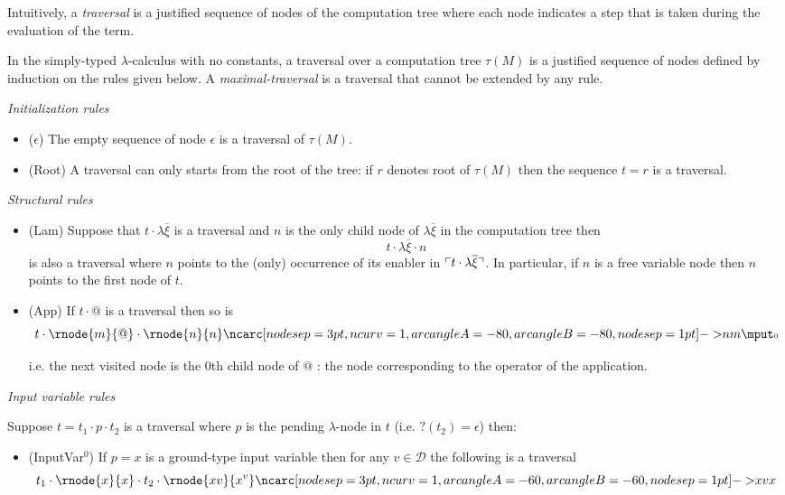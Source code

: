 Intuitively, a \emph{traversal} is a justified sequence of nodes of the computation tree where each node
indicates a step that is taken during the evaluation of the term.

\begin{dfn}
\label{def:traversal}
In the simply-typed $\lambda$-calculus with no constants,
a traversal over a computation tree $\tau(M)$
is a justified sequence of nodes defined by induction on the rules
given below. A \emph{maximal-traversal} is a traversal that cannot be
extended by any rule.

\emph{Initialization rules}
\begin{itemize}
\item ($\epsilon$) The empty sequence of node $\epsilon$ is a traversal of $\tau(M)$.

\item (Root) A traversal can only starts from the root of the tree: if $r$ denotes root of $\tau(M)$ then the sequence $t = r$
is a traversal.
\end{itemize}


\emph{Structural rules}
\begin{itemize}
\item (Lam) Suppose that $t \cdot \lambda \overline{\xi}$ is a traversal and $n$ is the only child node of $\lambda \overline{\xi}$ in
the computation tree then
$$t \cdot \lambda \overline{\xi} \cdot n$$
is also a traversal
where $n$ points to the (only) occurrence of its enabler in $\ulcorner t \cdot \lambda \overline{\xi} \urcorner$.
In particular, if $n$ is a free variable node then $n$ points to the first node of $t$.

\item (App) If $t \cdot @$ is a traversal then so is
$$t \cdot \rnode{m}{@} \cdot
\rnode{n}{n} \bkptra[nodesep=1pt]{80}{n}{m} \bklabelb{0}
$$

i.e. the next visited node is the $0$th child node of $@$ : the
node corresponding to the operator of the application.
\end{itemize}

\emph{Input variable rules}

Suppose $t = t_1 \cdot p \cdot t_2$ is a traversal where $p$ is the pending $\lambda$-node in $t$ (i.e. $?(t_2)=\epsilon$) then:
\begin{itemize}
\item (InputVar$^0$) If $p = x$ is a ground-type input variable then for any $v \in \mathcal{D}$
the following is a traversal
$$t_1 \cdot \rnode{x}{x} \cdot t_2 \cdot \rnode{xv}{x^v}
\bkptra[nodesep=1pt]{60}{xv}{x}$$



\end{itemize}
\end{dfn}
